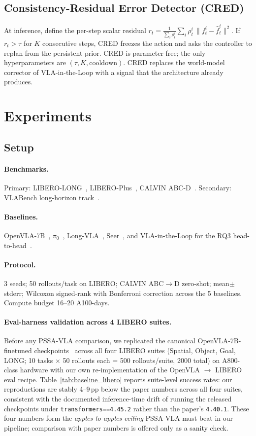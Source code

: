 \documentclass[10pt,letterpaper]{article}
\newcommand{\method}{\textsc{PSSA-VLA}\xspace}
\begin{document}
\subsection{Consistency-Residual Error Detector (CRED)}

At inference, define the per-step scalar residual
$r_t = \tfrac{1}{\sum_i \rho^i_t}\sum_i \rho^i_t\,\|f^i_t-\hat f^i_t\|^2$.
If $r_t > \tau$ for $K$ consecutive steps, CRED freezes the action and
asks the controller to replan from the persistent prior. CRED is
parameter-free; the only hyperparameters are $(\tau, K, \text{cooldown})$.
CRED replaces the world-model corrector of VLA-in-the-Loop with a signal
that the architecture already produces.

\section{Experiments}\label{sec:experiments}

\subsection{Setup}
\paragraph{Benchmarks.} Primary: LIBERO-LONG~\cite{libero},
LIBERO-Plus~\cite{liberoplus}, CALVIN ABC-D~\cite{calvin}. Secondary:
VLABench long-horizon track~\cite{vlabench}.
\paragraph{Baselines.} OpenVLA-7B~\cite{openvla}, $\pi_0$~\cite{pi0},
Long-VLA~\cite{longvla}, Seer~\cite{seer}, and VLA-in-the-Loop for the
RQ3 head-to-head~\cite{vlaintheloop}.
\paragraph{Protocol.} 3 seeds; 50 rollouts/task on LIBERO; CALVIN
ABC$\to$D zero-shot; mean$\pm$stderr; Wilcoxon signed-rank with Bonferroni
correction across the 5 baselines. Compute budget 16--20 A100-days.

\paragraph{Eval-harness validation across 4 LIBERO suites.}
Before any \method comparison, we replicated the canonical
OpenVLA-7B-finetuned checkpoints~\cite{openvla} across all four LIBERO
suites (Spatial, Object, Goal, LONG; 10 tasks $\times$ 50 rollouts each
= 500 rollouts/suite, 2000 total) on A800-class hardware with our
own re-implementation of the OpenVLA $\to$ LIBERO eval recipe.
Table~\ref{tab:baseline_libero} reports suite-level success rates: our
reproductions are stably 4--9\,pp below the paper numbers across all
four suites, consistent with the documented inference-time drift of
running the released checkpoints under \texttt{transformers==4.45.2}
rather than the paper's \texttt{4.40.1}. These four numbers form the
\emph{apples-to-apples ceiling} \method must beat in our pipeline;
comparison with paper numbers is offered only as a sanity check.
\end{document}
